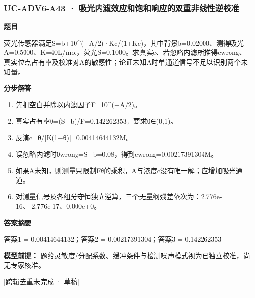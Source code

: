 \documentclass[UTF8,11pt,a4paper]{ctexart}
\begin{document}
\subsubsection*{UC-ADV6-A43 · 吸光内滤效应和饱和响应的双重非线性逆校准}
\noindent\textbf{题目}\par
荧光传感器满足S=b+10\textasciicircum{}(−A/2)·Kc/(1+Kc)，其中背景b=0.02000、测得吸光A=0.5000、K=40L/mol，荧光S=0.1000。求真实c、若忽略内滤所推得cwrong、真实位点占有率及校准对A的敏感性；论证未知A时单通道信号不足以识别两个未知量。\par
\medskip\noindent\textbf{分步解答}
\begin{enumerate}
\item 先扣空白并除以内滤因子F=10\textasciicircum{}(−A/2)。
\item 真实占有率θ=(S−b)/F=0.142262353，要求θ∈(0,1)。
\item 反演c=θ/[K(1−θ)]=0.00414644132M。
\item 误忽略内滤时θwrong=S−b=0.08，得到cwrong=0.00217391304M。
\item 如果A未知，则测量只限制Fθ的乘积，A与浓度c没有唯一解；应增加吸光通道。
\item 对测量信号及各组分守恒独立逆算，三个无量纲残差依次为：2.776e-16、-2.776e-17、0.000e+0。
\end{enumerate}
\noindent\textbf{答案摘要}\par
答案1 = 0.00414644132；答案2 = 0.00217391304；答案3 = 0.142262353\par
\noindent\textbf{模型前提：}
题给灵敏度/分配系数、缓冲条件与检测噪声模式视为已独立校准，尚无专家核准。\par
\noindent\textcolor{red!65!black}{[跨辑去重未完成 · 草稿]} \par
\medskip\hrule\medskip
{}
\end{document}
